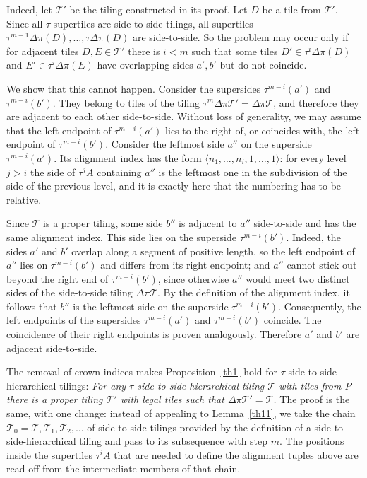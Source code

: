 \documentclass[12pt]{article}
\theoremstyle{remark}
\newcommand{\pair}[1]{\langle #1\rangle}
\begin{document}
\begin{itemize}
Indeed, let $\mathcal T'$ be the tiling constructed in its proof.
Let $D$ be a tile from  $\mathcal T'$.  Since all $\tau$-supertiles are side-to-side tilings,
all supertiles $\tau^{m-1}\Delta\pi(D),\dots,\tau\Delta \pi(D)$ are side-to-side. So the problem may occur
only if for adjacent tiles $D,E\in  \mathcal T'$
there is $i<m$ such that some tiles $D'\in\tau^i \Delta\pi(D)$ and $E'\in\tau^i \Delta\pi(E)$
have overlapping sides $a',b'$ but do not coincide.

We show that this cannot happen. Consider the supersides $\tau^{m-i}(a')$
and $\tau^{m-i}(b')$. They belong to tiles of the tiling
$\tau^m\Delta\pi\mathcal T'=\Delta\pi\mathcal T$, and therefore they are
adjacent to each other side-to-side. Without loss of generality, we may
assume that the left endpoint of $\tau^{m-i}(a')$ lies to the right of,
or coincides with, the left endpoint of $\tau^{m-i}(b')$. Consider the
leftmost side $a''$ on the superside $\tau^{m-i}(a')$. Its alignment index
has the form $\pair{n_1,\dots,n_i,1,\dots,1}$: for every level $j>i$ the side of $\tau^jA$
containing $a''$ is the leftmost one in the subdivision of the side of the previous level, and it
is exactly here that the numbering has to be relative.

Since $\mathcal T$ is a
proper tiling, some side $b''$ is
adjacent to $a''$ side-to-side and has the same alignment index. This side lies on the superside
$\tau^{m-i}(b')$. Indeed, the sides $a'$ and $b'$ overlap along a segment of positive length, so
the left endpoint of $a''$ lies on $\tau^{m-i}(b')$ and differs from its right endpoint; and $a''$
cannot stick out beyond the right end of $\tau^{m-i}(b')$, since otherwise $a''$ would meet two
distinct sides of the side-to-side tiling $\Delta\pi\mathcal T$. By the
definition of the alignment index, it follows that $b''$ is the leftmost
side on the superside $\tau^{m-i}(b')$. Consequently, the left endpoints
of the supersides $\tau^{m-i}(a')$ and $\tau^{m-i}(b')$ coincide. The
coincidence of their right endpoints is proven analogously. Therefore
$a'$ and $b'$ are adjacent side-to-side.
\end{itemize}

The removal of crown indices makes Proposition~\ref{th1} hold for
$\tau$-side-to-side-hierarchical tilings: \emph{For any $\tau$-side-to-side-hierarchical tiling $\mathcal  T$ with tiles from $P$ there
is a proper tiling $\mathcal T '$ with legal tiles such that $\Delta\pi\mathcal T' =\mathcal  T$.}
The proof is the same, with one change: instead of appealing to Lemma~\ref{th11}, we take the chain
$\mathcal T_0=\mathcal T,\mathcal T_1,\mathcal T_2,\dots$ of side-to-side tilings provided by the
definition of a side-to-side-hierarchical tiling and pass to its subsequence with step $m$. The
positions inside the supertiles $\tau^iA$ that are needed to define the alignment tuples above are
read off from the intermediate members of that chain.
\end{document}
